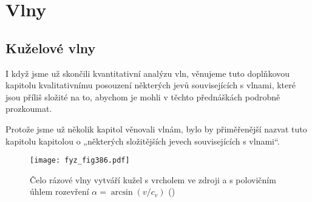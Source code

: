 \chapter{Vlny}\label{fyz:IchapLI}
\minitoc
\section{Kuželové vlny}\label{fyz:IchapLIsecI}
  I když jsme už skončili kvantitativní analýzu vln, věnujeme tuto doplňkovou kapitolu 
  kvalitativnímu posouzení některých jevů souvisejících s vlnami, které jsou příliš složité na to, 
  abychom je mohli v těchto přednáškách podrobně prozkoumat.
  
  Protože jsme už několik kapitol věnovali vlnám, bylo by přiměřenější nazvat tuto kapitolu 
  kapitolou o „některých složitějších jevech souvisejících s vlnami“.
  
  \begin{figure}[ht!] %
    \centering
    \texttt{[image: fyz\_fig386.pdf]}
    \caption{Čelo rázové vlny vytváří kužel s vrcholem ve zdroji a s polovičním úhlem rozevření
             \(\alpha =\arcsin(v/c_v)\)
             (\cite[s.~686]{Feynman01})}
    \label{fyz:fig386}
  \end{figure}


